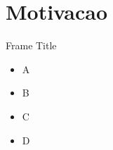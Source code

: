 \section{Motivacao}

\begin{frame}{Frame Title}
    \begin{itemize}
        \item A
        \item B
        \item C 
        \item D 
    \end{itemize}
\end{frame}

